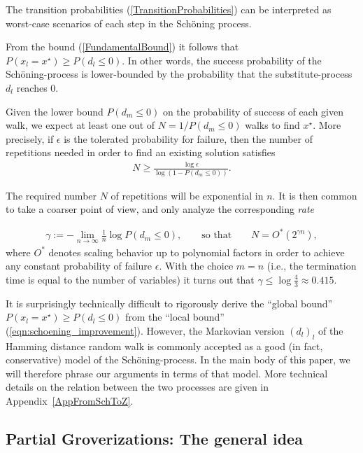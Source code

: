 \documentclass[a4paper,aps,floatfix]{revtex4}
\begin{document}
The transition probabilities (\ref{TransitionProbabilities}) can be interpreted as worst-case scenarios of each step in the Sch\"oning process.

From the bound (\ref{FundamentalBound}) it follows that $P(x_l = x^\star) \geq  P(d_l \leq 0)$. 
In other words, the success probability of the Sch\"oning-process is lower-bounded by the probability that the substitute-process $d_l$ reaches $0$. 


Given the lower bound $P(d_m \leq 0)$ on the probability of success of each given walk, we expect at least one out of $N=1/P(d_m \leq 0)$ walks to find $x^\star$.
More precisely, if $\epsilon$ is the tolerated probability for failure, then the number of repetitions needed in order to find an existing solution satisfies
\begin{align}\label{eqn:sampling_overhead}
	N\geq 
	\frac{\log{\epsilon}}{\log(1-P(d_m\leq 0))}.
\end{align}



The required number $N$ of repetitions will be exponential in $n$.
It is then common to take a coarser point of view, and only analyze the corresponding \emph{rate} 

\begin{align}\label{eqn:rate}
	\gamma := -\lim_{n\rightarrow \infty}\frac{1}{n} \log 
	P(d_m\leq 0),
	\qquad\text{so that}\qquad
	N=O^{*}(2^{\gamma n}),
\end{align}
where $O^*$ denotes scaling behavior up to polynomial factors in order to achieve any constant probability of failure $\epsilon$.
With the choice $m = n$ (i.e., the termination time is equal to the number of variables) it turns out \cite{Schoening99,SchoeningToranBook} 
that 
$\gamma \leq \log\frac{4}{3}\approx 0.415$. 


It is surprisingly technically difficult to rigorously derive the ``global bound'' $P(x_l=x^\star)\geq P(d_l \leq 0)$ 
from the  ``local bound'' (\ref{eqn:schoening_improvement}).
However, the Markovian version $(d_l)_l$ of the Hamming distance random walk is commonly accepted as a good (in fact, conservative) model of the Sch\"oning-process.
In the main body of this paper, we will therefore phrase our arguments in terms of that model.
More technical details on the relation between the two processes are given in Appendix~\ref{AppFromSchToZ}.


\subsection{Partial Groverizations: The general idea}
\end{document}
